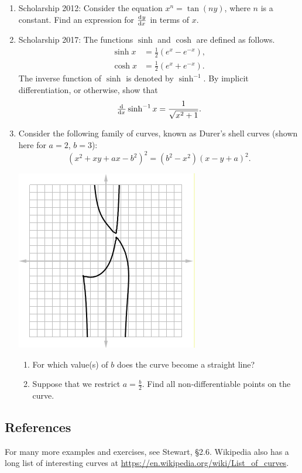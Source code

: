 \begin{enumerate}
  \item Scholarship 2012: Consider the equation $ x^n = \tan(ny) $, where $ n $ is a constant. Find an expression
        for $ \od{y}{x} $ in terms of $ x $.
  \item Scholarship 2017: The functions $ \sinh $ and $ \cosh $ are defined as follows.
        \begin{align*}
          \sinh x &= \frac{1}{2}\left(e^x - e^{-x}\right),\\
          \cosh x &= \frac{1}{2}\left(e^x + e^{-x}\right).
        \end{align*}
        The inverse function of $ \sinh $ is denoted by $ \sinh^{-1} $. By implicit differentiation, or
        otherwise, show that
        \begin{displaymath}
          \od{}{x} \sinh^{-1} x = \frac{1}{\sqrt{x^2 + 1}}.
        \end{displaymath}
  \item Consider the following family of curves, known as Durer's shell curves (shown here for $ a = 2 $, $ b = 3 $):
        \begin{displaymath}
          (x^2 + xy + ax - b^2)^2 = (b^2 - x^2)(x - y + a)^2.
        \end{displaymath}
        \begin{center}
          \includegraphics[width=0.3\linewidth]{durer}
        \end{center}
    \begin{enumerate}
      \item For which value(s) of $ b $ does the curve become a straight line?
      \item Suppose that we restrict $ a = \frac{b}{2} $. Find all non-differentiable points on the curve.
    \end{enumerate}
\end{enumerate}

\subsection{References}
For many more examples and exercises, see Stewart, \S2.6. Wikipedia also has a long list of interesting curves
at \url{https://en.wikipedia.org/wiki/List_of_curves}.

